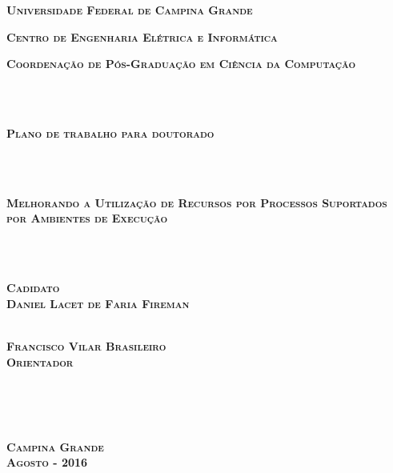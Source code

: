 
\pagestyle{empty}

\begin{center}
{\textbf{\textsc{Universidade Federal de Campina Grande}}}
\end{center}

\begin{center}
\textbf{{\textsc{Centro de Engenharia Elétrica e Informática}}}
\end{center}

\begin{center}
{\textsc{\textbf{Coordenação de Pós-Graduação em Ciência da Computação}}}
\end{center}

~\\ \\

\begin{center}
{\textsc{\textbf{Plano de trabalho para doutorado}}}
\end{center}

~\\ \\

\begin{center}
{\Large \textsc{\textbf{Melhorando a Utilização de Recursos por Processos Suportados por Ambientes de Execução}}}
\end{center}

~\\ \\

\begin{center}
\textbf{\textsc{Cadidato} \\
\textsc{Daniel Lacet de Faria Fireman}}
\end{center}

\vspace{2in}

\begin{center}
\makebox[3in]{\hrulefill} \\
\textbf{\textsc{Francisco Vilar Brasileiro} \\
\textsc{Orientador}}
\end{center}

~\\ \\ \\

\begin{center}
\textbf{{\large \textsc{Campina Grande}}
\\
{\large \textsc{Agosto - 2016}}}
\end{center}

\newpage
\cleardoublepage

